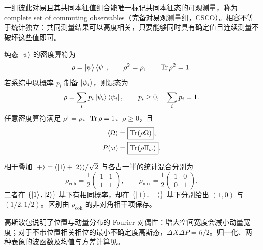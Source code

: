 一组彼此对易且其共同本征值组合能唯一标记共同本征态的可观测量，称为 complete set of commuting observables（完备对易观测量组，CSCO）。相容不等于统计独立：共同测量结果可以高度相关，只要能够同时具有确定值且连续测量不破坏这些值即可。



纯态 $\left|\psi\right\rangle$ 的密度算符为
\begin{equation}
  \rho=\left|\psi\right\rangle\left\langle \psi\right|,
  \qquad
  \rho^2=\rho,
  \qquad
  \operatorname{Tr}\rho^2=1.
  \label{eq:QM-C04-S02-pure-density-operator}
\end{equation}
若系综中以概率 $p_i$ 制备 $\left|\psi_i\right\rangle$，则混态为
\begin{equation}
  \rho=\sum_i p_i\left|\psi_i\right\rangle\left\langle \psi_i\right|,
  \qquad
  p_i\geq0,
  \quad\sum_i p_i=1.
  \label{eq:QM-C04-S02-mixed-density-operator}
\end{equation}
任意密度算符满足 $\rho^\dagger=\rho$、$\operatorname{Tr}\rho=1$、$\rho\geq0$，且
\begin{align}
  \langle\Omega\rangle
  &=\boxed{\operatorname{Tr}(\rho\Omega)},
  \label{eq:QM-C04-S02-density-expectation}\\
  P(\omega)
  &=\boxed{\operatorname{Tr}(\rho\Pi_\omega)}.
  \label{eq:QM-C04-S02-density-born-rule}
\end{align}

相干叠加 $\left|+\right\rangle=(\left|1\right\rangle+\left|2\right\rangle)/\sqrt2$ 与各占一半的统计混合分别为
\begin{equation}
  \rho_{\mathrm{coh}}
  =\frac12\begin{pmatrix}1&1\\1&1\end{pmatrix},
  \qquad
  \rho_{\mathrm{mix}}
  =\frac12\begin{pmatrix}1&0\\0&1\end{pmatrix}.
  \label{eq:QM-C04-S02-coherent-vs-mixture}
\end{equation}
二者在 $\{\left|1\right\rangle,\left|2\right\rangle\}$ 基下有相同概率，却在 $\{\left|+\right\rangle,\left|-\right\rangle\}$ 基下分别给出 $(1,0)$ 与 $(1/2,1/2)$。区别由 $\rho_{\mathrm{coh}}$ 的非对角相干项保存。

高斯波包说明了位置与动量分布的 Fourier 对偶性：增大空间宽度会减小动量宽度；对于不带位置相关相位的最小不确定度高斯态，$\Delta X\Delta P=\hbar/2$。归一化、两种表象的波函数及均值与方差计算见。

